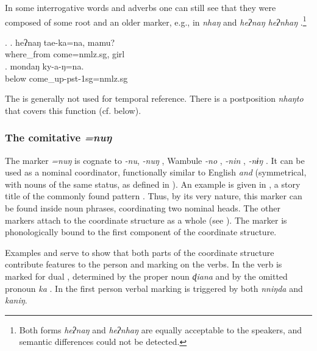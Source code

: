  
In some interrogative words and adverbs one can still see that they were composed of some root and an older  marker, e.g.,  in \emph{nhaŋ}  and \emph{heʔnaŋ \ti heʔnhaŋ} .\footnote{Both forms  \emph{heʔnaŋ} and \emph{heʔnhaŋ} are equally acceptable to the speakers, and semantic differences could not be detected.} 

\ex. \ag. heʔnaŋ tae-ka=na, mamu?\\
		where\_from come{=nmlz.sg}, girl\\
	\bg. mondaŋ ky-a-ŋ=na.\\
		below{\sc [abl]} come\_up{\sc -pst-1sg=nmlz.sg}\\
		
The  is generally not used for temporal reference. There is a postposition \emph{nhaŋto} that covers this function (cf.  below).
 

\subsubsection{The comitative  \emph{=nuŋ}}\label{case-com}

The  marker  \emph{=nuŋ} is cognate to  \emph{-nu},   \emph{-nuŋ} \citep[81]{Ebert1994The-structure}, Wambule \emph{-no} \citep[157]{Opgenort2004A-Grammar},  \emph{-nin} \citep[91]{Doornenbal2009A-grammar},  \emph{-nɨŋ} \citep[80]{Schikowski2012_Morphology}. It can be used as a nominal coordinator, functionally similar to English \emph{and}  (symmetrical, with nouns of the same status, as defined in  \citealt[3]{Haspelmath2004_overview}). An example is given in \Next[a], a story title of the commonly found pattern . Thus, by its very nature, this  marker can be found inside noun phrases, coordinating two nominal heads. The other  markers attach to the coordinate structure as a whole (see \Next[b]). The marker is phonologically bound to the first component of the coordinate structure.

Examples \Next[c] and \Next[d] serve to show that both parts of the  coordinate structure contribute features to the person and  marking on the verbs. In \Next[c] the verb is marked for dual , determined by the proper noun \emph{ɖiana} and by the omitted pronoun \emph{ka} . In \Next[d] the first person  verbal marking is triggered by both \emph{nniŋda} and \emph{kaniŋ}.
\largerpage

